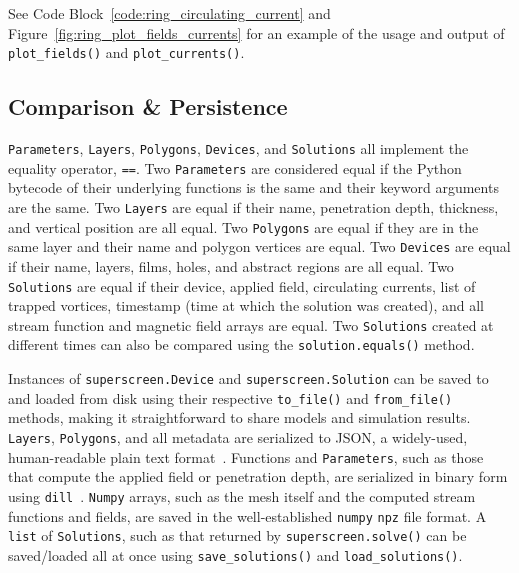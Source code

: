 \documentclass[final,3p,times]{elsarticle}
\newcommand{\inline}[1]{\texttt{#1}\xspace}
\begin{document}
See Code Block~\ref{code:ring_circulating_current} and  Figure~\ref{fig:ring_plot_fields_currents} for an example of the usage and output of \inline{plot_fields()} and \inline{plot_currents()}.

\subsection{Comparison \& Persistence}
\label{section:overview:persistence}

\inline{Parameters}, \inline{Layers}, \inline{Polygons}, \inline{Devices}, and \inline{Solutions} all implement the equality operator, \inline{==}. Two \inline{Parameters} are considered equal if the Python bytecode of their underlying functions is the same and their keyword arguments are the same. Two \inline{Layers} are equal if their name, penetration depth, thickness, and vertical position are all equal. Two \inline{Polygons} are equal if they are in the same layer and their name and polygon vertices are equal. Two \inline{Devices} are equal if their name, layers, films, holes, and abstract regions are all equal. Two \inline{Solutions} are equal if their device, applied field, circulating currents, list of trapped vortices, timestamp (time at which the solution was created), and all stream function and magnetic field arrays are equal. Two \inline{Solutions} created at different times can also be compared using the  \inline{solution.equals()} method.

Instances of \inline{superscreen.Device} and \inline{superscreen.Solution} can be saved to and loaded from disk using their respective \inline{to_file()} and \inline{from_file()} methods, making it straightforward to share models and simulation results. \inline{Layers}, \inline{Polygons}, and all metadata are serialized to JSON, a widely-used, human-readable plain text format~\cite{JSON}. Functions and \inline{Parameters}, such as those that compute the applied field or penetration depth, are serialized in binary form using \inline{dill}~\cite{McKerns}. \inline{Numpy} arrays, such as the mesh itself and the computed stream functions and fields, are saved in the well-established \inline{numpy} \inline{npz} file format. A \inline{list} of \inline{Solutions}, such as that returned by \inline{superscreen.solve()} can be saved/loaded all at once using \inline{save_solutions()} and \inline{load_solutions()}.
\end{document}

